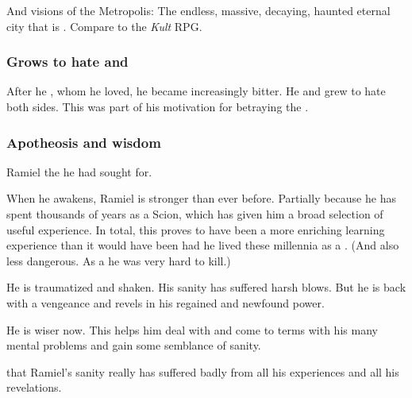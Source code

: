 And visions of the Metropolis: The endless, massive, decaying, haunted eternal city that is \Nyx. Compare to the \emph{Kult} RPG. 





\subsubsection{Grows to hate \dragons{} and \banes}
After he , whom he loved, he became increasingly bitter. 
He  and grew to hate both sides. 
This was part of his motivation for betraying the \banelords. 





\subsubsection{Apotheosis and wisdom}
Ramiel  the  he had sought for. 

When he awakens, Ramiel is stronger than ever before. 
Partially because he has spent thousands of years  as a Scion, which has given him a broad selection of useful experience. 
In total, this proves to have been a more enriching learning experience than it would have been had he lived these millennia as a \resphan. 
(And also less dangerous.
As a \malach he was very hard to kill.)

He is traumatized and shaken. 
His sanity has suffered harsh blows.
But he is back with a vengeance and revels in his regained and newfound power.

He is wiser now. 
This helps him deal with and come to terms with his many mental problems and gain some semblance of sanity. 

 that Ramiel's sanity really has suffered badly from all his experiences and all his revelations.

